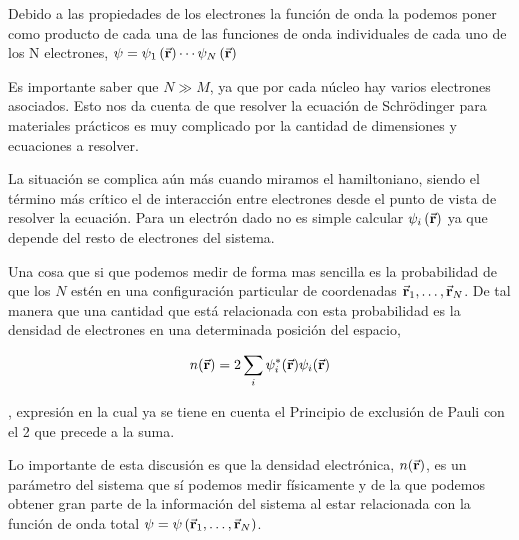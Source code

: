 Debido a las propiedades de los electrones la función de onda la podemos poner como producto de cada una de las funciones de onda individuales de cada uno de los N electrones, $\psi = \psi_{1} \left( \va{r} \right) \cdots \psi_{N} \left( \va{r} \right)$ 

Es importante saber que $N \gg M$, ya que por cada núcleo hay varios electrones asociados. Esto nos da cuenta de que resolver la ecuación de Schrödinger para materiales prácticos es muy complicado por la cantidad de dimensiones y ecuaciones a resolver. 

La situación se complica aún más cuando miramos el hamiltoniano, siendo el término más crítico el de interacción entre electrones desde el punto de vista de resolver la ecuación. Para un electrón dado no es simple calcular $\psi_{i} \left( \va{r} \right)$ ya que depende del resto de electrones del sistema.

Una cosa que si que podemos medir de forma mas sencilla es la probabilidad de que los $N$ estén en una configuración particular de coordenadas $\va{r}_{1} , \dots , \va{r}_{N}$. De tal manera que una cantidad que está relacionada con esta probabilidad es la densidad de electrones en una determinada posición del espacio, 

\begin{equation}
    n(\va{r}) = 2 \sum_i \psi^*_i (\va{r}) \psi_i (\va{r})
\end{equation}

, expresión en la cual ya se tiene en cuenta el Principio de exclusión de Pauli con el 2 que precede a la suma.

Lo importante de esta discusión es que la densidad electrónica, $n(\va{r})$, es un parámetro del sistema que sí podemos medir físicamente y de la que podemos obtener gran parte de la información del sistema al estar relacionada con la función de onda total  $\psi = \psi \left( \va{r}_{1} , \dots , \va{r}_{N} \right)$.